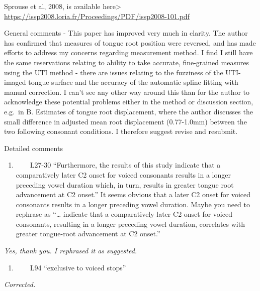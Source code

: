 \documentclass[]{article}
\providecommand{\tightlist}{%
  \setlength{\itemsep}{0pt}\setlength{\parskip}{0pt}}
\begin{document}
Sprouse et al, 2008, is available here\textgreater{}
\url{https://issp2008.loria.fr/Proceedings/PDF/issp2008-101.pdf}

General comments - This paper has improved very much in clarity. The
author has confirmed that measures of tongue root position were
reversed, and has made efforts to address my concerns regarding
measurement method. I find I still have the same reservations relating
to ability to take accurate, fine-grained measures using the UTI method
- there are issues relating to the fuzziness of the UTI-imaged tongue
surface and the accuracy of the automatic spline fitting with manual
correction. I can't see any other way around this than for the author to
acknowledge these potential problems either in the method or discussion
section, e.g.~in B. Estimates of tongue root displacement, where the
author discusses the small difference in adjusted mean root displacement
(0.77-1.0mm) between the two following consonant conditions. I therefore
suggest revise and resubmit.

Detailed comments

\begin{enumerate}
\def\labelenumi{\arabic{enumi}.}
\tightlist
\item
  ~~~~L27-30 ``Furthermore, the results of this study indicate that a
  comparatively later C2 onset for voiced consonants results in a longer
  preceding vowel duration which, in turn, results in greater tongue
  root advancement at C2 onset.'' It seems obvious that a later C2 onset
  for voiced consonants results in a longer preceding vowel duration.
  Maybe you need to rephrase as ``\ldots{} indicate that a comparatively
  later C2 onset for voiced consonants, resulting in a longer preceding
  vowel duration, correlates with greater tongue-root advancement at C2
  onset.''
\end{enumerate}

\begin{adjustwidth}{1cm}{} \textit{
Yes, thank you. I rephrased it as suggested.
} \end{adjustwidth}

\begin{enumerate}
\def\labelenumi{\arabic{enumi}.}
\setcounter{enumi}{1}
\tightlist
\item
  ~~~~L94 ``exclusive to voiced stops''
\end{enumerate}

\begin{adjustwidth}{1cm}{} \textit{
Corrected.
} \end{adjustwidth}
\end{document}
